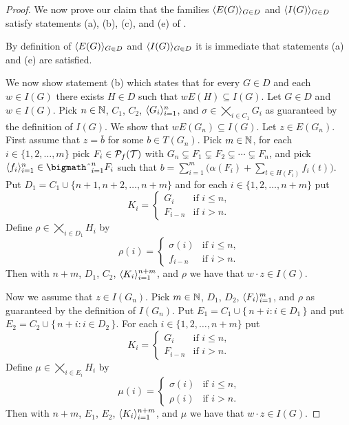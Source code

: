 \begin{proof}
  We now prove our claim that the families $\langle E(G) \rangle_{G \in D}$ and $\langle I(G) \rangle_{G \in D}$ satisfy statements (a), (b), (c), and (e) of \cite[Lemma 14.9]{Hindman:1998fk}.

  By definition of $\langle E(G) \rangle_{G \in D}$ and $\langle I(G) \rangle_{G \in D}$ it is immediate that statements (a) and (e) are satisfied. 

  We now show statement (b) which states that for every $G \in D$ and each $w \in I(G)$ there exists $H \in D$ such that $w E(H) \subseteq I(G)$.
  Let $G \in D$ and $w \in I(G)$. 
  Pick $n \in \mathbb{N}$, $C_1$, $C_2$, $\langle G_i \rangle_{i=1}^n$, and $\sigma \in \bigtimes_{i \in C_1} G_i$ as guaranteed by the definition of $I(G)$.
  We show that $w E(G_n) \subseteq I(G)$. 
  Let $z \in E(G_n)$. 
  First assume that $z = \overline{b}$ for some $b \in T(G_n)$. 
  Pick $m \in \mathbb{N}$, for each $i \in \{1, 2, \ldots, m\}$ pick $F_i \in \mathcal{P}_f(\mathcal{T})$ with $G_n \subsetneq F_1 \subsetneq F_2 \subsetneq \cdots \subsetneq F_n$, and pick $\la f_i \ra_{i=1}^n \in \bigtimes_{i=1}^n F_i$ such that $b = \sum_{i=1}^m \bigl( \alpha(F_i) + \sum_{t \in H(F_i)} f_i(t) \bigr)$. 
  Put $D_1 = C_1 \cup \{n+1, n+2, \ldots, n+m\}$ and for each $i \in \{1, 2, \ldots, n+m\}$ put 
  \[
    K_i = 
    \begin{cases}
      G_i & \mbox{if $i \le n$,} \\
      F_{i-n} & \mbox{if $i > n$.}
    \end{cases}
  \]
  Define $\rho \in \bigtimes_{i \in D_1} H_i$ by 
  \[
    \rho(i) =
    \begin{cases}
      \sigma(i) & \mbox{if $i \le n$,} \\
      f_{i-n} & \mbox{if $i > n$.}
    \end{cases}
  \]
  Then with $n+m$, $D_1$, $C_2$, $\langle K_i \rangle_{i=1}^{n+m}$, and $\rho$ we have that $w \cdot z \in I(G)$. 

  Now we assume that $z \in I(G_n)$. 
  Pick $m \in \mathbb{N}$, $D_1$, $D_2$, $\langle F_i \rangle_{i=1}^m$, and $\rho$ as guaranteed by the definition of $I(G_n)$. 
  Put $E_1 = C_1 \cup \{\,n + i : i \in D_1 \,\}$ and put $E_2 = C_2 \cup \{\, n + i : i \in D_2 \,\}$.
  For each $i \in \{1, 2, \ldots, n+m\}$ put
  \[
    K_i = 
    \begin{cases}
      G_i & \mbox{if $i \le n$,} \\
      F_{i-n} & \mbox{if $i > n$.}
    \end{cases}
  \]
  Define $\mu \in \bigtimes_{i \in E_i} H_i$ by
  \[
    \mu(i) = 
    \begin{cases}
      \sigma(i) & \mbox{if $i \le n$,} \\
      \rho(i) & \mbox{if $i > n$.}
    \end{cases}
  \]
  Then with $n+m$, $E_1$, $E_2$, $\langle K_i \rangle_{i=1}^{n+m}$, and $\mu$ we have that $w \cdot z \in I(G)$.


\end{proof}
